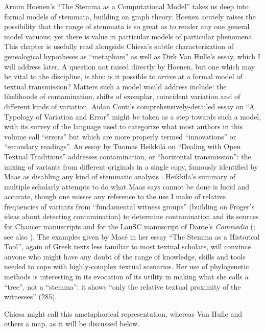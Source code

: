 \begin{review}
Armin Hoenen's ``The Stemma as a Computational Model'' takes us
deep into formal models of stemmata, building on graph theory. Hoenen
acutely raises the possibility that the range of stemmata is so great as
to render any one general model vacuous; yet there is value in
particular models of particular phenomena. This chapter is usefully read
alongside Chiesa's subtle characterization of genealogical hypotheses as
``metaphors'' as well as Dirk Van Hulle's essay, which I will address
later. A question not raised directly by Hoenen, but one which may be
vital to the discipline, is this: is it possible to arrive at a formal
model of textual transmission? Matters such a model would address
include: the likelihoods of contamination, shifts of exemplar,
coincident variation and of different kinds of variation. Aidan Conti's
comprehensively-detailed essay on ``A Typology of Variation and Error''
might be taken as a step towards such a model, with its survey of the
language used to categorize what most authors in this volume call
``errors'' but which are more properly termed ``innovations'' or
``secondary readings''. An essay by Tuomas Heikkilä on ``Dealing with
Open Textual Traditions'' addresses contamination, or ``horizontal
transmission'': the mixing of variants from different originals in a
single copy, famously identified by Maas as disabling any kind of
stemmatic analysis \parencite{maas_textual_1958}. Heikkilä's summary of multiple scholarly
attempts to do what Maas says cannot be done is lucid and accurate,
though one misses any reference to the use I make of relative
frequencies of variants from ``fundamental witness groups'' (building on
Froger's ideas about detecting contamination) to determine contamination
and its sources for Chaucer manuscripts and for the LauSC manuscript of
Dante's \emph{Commedia} (\cite{robinson_stemmatic_1997}; see also \cite{robinson_l0_2021}). The examples given by Macé in her essay ``The Stemma as a
Historical Tool'', again of Greek texts less familiar to most textual
scholars, will convince anyone who might have any doubt of the range of
knowledge, skills and tools needed to cope with highly-complex textual
scenarios. Her use of phylogenetic methods is interesting in its
evocation of its utility in making what she calls a ``tree'', not a
``stemma'': it shows ``only the relative textual proximity of the
witnesses'' (285). 

\newpage

\noindent Chiesa might call this ametaphorical representation,
whereas Van Hulle and others a map, as it will be discussed below.


\end{review}
